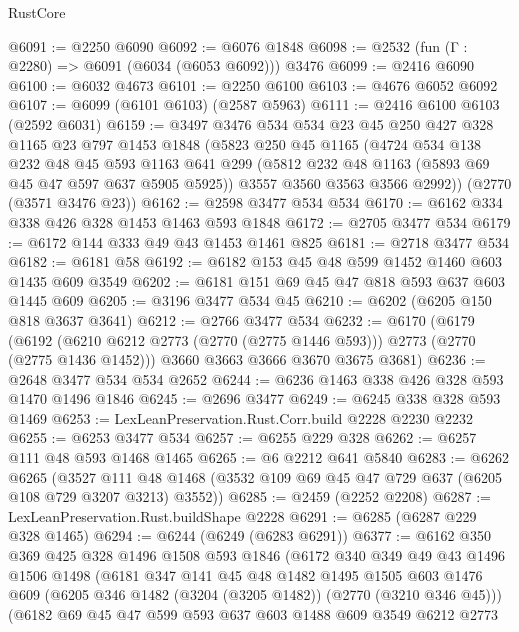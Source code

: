 \begin{lexlean}{RustCore}
\begin{coremodule}
@6091 := @2250 @6090
@6092 := @6076 @1848
@6098 := @2532 (fun (Γ : @2280) => @6091 (@6034 (@6053 @6092))) @3476
@6099 := @2416 @6090
@6100 := @6032 @4673
@6101 := @2250 @6100
@6103 := @4676 @6052 @6092
@6107 := @6099 (@6101 @6103) (@2587 @5963)
@6111 := @2416 @6100 @6103 (@2592 @6031)
@6159 := @3497
    @3476
    @534
    @534
    @23
    @45
    @250
    @427
    @328
    @1165
    @23
    @797
    @1453
    @1848
    (@5823
      @250
      @45
      @1165
      (@4724
        @534
        @138
        @232
        @48
        @45
        @593
        @1163
        @641
        @299
        (@5812 @232 @48 @1163 (@5893 @69 @45 @47 @597 @637 @5905 @5925))
        @3557
        @3560
        @3563
        @3566
        @2992))
    (@2770 (@3571 @3476 @23))
@6162 := @2598 @3477 @534 @534
@6170 := @6162 @334 @338 @426 @328 @1453 @1463 @593 @1848
@6172 := @2705 @3477 @534
@6179 := @6172 @144 @333 @49 @43 @1453 @1461 @825
@6181 := @2718 @3477 @534
@6182 := @6181 @58
@6192 := @6182 @153 @45 @48 @599 @1452 @1460 @603 @1435 @609 @3549
@6202 := @6181 @151 @69 @45 @47 @818 @593 @637 @603 @1445 @609
@6205 := @3196 @3477 @534 @45
@6210 := @6202 (@6205 @150 @818 @3637 @3641)
@6212 := @2766 @3477 @534
@6232 := @6170
    (@6179
      (@6192 (@6210 @6212 @2773 (@2770 (@2775 @1446 @593))) @2773 (@2770 (@2775 @1436 @1452)))
      @3660
      @3663
      @3666
      @3670
      @3675
      @3681)
@6236 := @2648 @3477 @534 @534 @2652
@6244 := @6236 @1463 @338 @426 @328 @593 @1470 @1496 @1846
@6245 := @2696 @3477
@6249 := @6245 @338 @328 @593 @1469
@6253 := LexLeanPreservation.Rust.Corr.build @2228 @2230 @2232
@6255 := @6253 @3477 @534
@6257 := @6255 @229 @328
@6262 := @6257 @111 @48 @593 @1468 @1465
@6265 := @6 @2212 @641 @5840
@6283 := @6262
    @6265
    (@3527 @111 @48 @1468 (@3532 @109 @69 @45 @47 @729 @637 (@6205 @108 @729 @3207 @3213) @3552))
@6285 := @2459 (@2252 @2208)
@6287 := LexLeanPreservation.Rust.buildShape @2228
@6291 := @6285 (@6287 @229 @328 @1465)
@6294 := @6244 (@6249 (@6283 @6291))
@6377 := @6162
    @350
    @369
    @425
    @328
    @1496
    @1508
    @593
    @1846
    (@6172
      @340
      @349
      @49
      @43
      @1496
      @1506
      @1498
      (@6181
        @347
        @141
        @45
        @48
        @1482
        @1495
        @1505
        @603
        @1476
        @609
        (@6205 @346 @1482 (@3204 (@3205 @1482)) (@2770 (@3210 @346 @45)))
        (@6182
          @69
          @45
          @47
          @599
          @593
          @637
          @603
          @1488
          @609
          @3549
          @6212
          @2773

\end{coremodule}
\end{lexlean}
